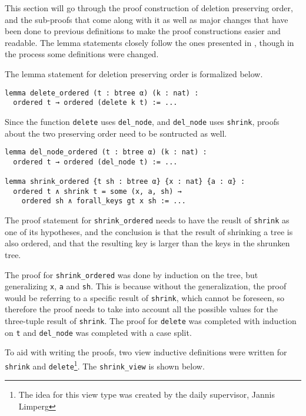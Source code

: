 This section will go through the proof construction of deletion preserving order, and the sub-proofs that come along with it as well as major changes that have been done to previous definitions to make the proof constructions easier and readable. The lemma statements closely follow the ones presented in \cite{textbook:discrete_computer}, though in the process some definitions were changed.

The lemma statement for deletion preserving order is formalized below.

\begin{lstlisting}
lemma delete_ordered (t : btree α) (k : nat) :
  ordered t → ordered (delete k t) := ...
\end{lstlisting}

Since the function \lstinline{delete} uses \lstinline{del_node}, and \lstinline{del_node} uses \lstinline{shrink}, proofs about the two preserving order need to be sontructed as well.

\begin{lstlisting}
lemma del_node_ordered (t : btree α) (k : nat) :
  ordered t → ordered (del_node t) := ...

lemma shrink_ordered {t sh : btree α} {x : nat} {a : α} :
  ordered t ∧ shrink t = some (x, a, sh) →
    ordered sh ∧ forall_keys gt x sh := ...
\end{lstlisting}

The proof statement for \lstinline{shrink_ordered} needs to have the reuslt of \lstinline{shrink} as one of its hypotheses, and the conclusion is that the result of shrinking a tree is also ordered, and that the resulting key is larger than the keys in the shrunken tree.

The proof for \lstinline{shrink_ordered} was done by induction on the tree, but generalizing \lstinline{x}, \lstinline{a} and \lstinline{sh}. This is because without the generalization, the proof would be referring to a specific result of \lstinline{shrink}, which cannot be foreseen, so therefore the proof needs to take into account all the possible values for the three-tuple result of \lstinline{shrink}. The proof for \lstinline{delete} was completed with induction on \lstinline{t} and \lstinline{del_node} was completed with a case split.

To aid with writing the proofs, two view inductive definitions were written for \lstinline{shrink} and \lstinline{delete}\footnote{The idea for this view type was created by the daily supervisor, Jannis Limperg}. The \lstinline{shrink_view} is shown below.

